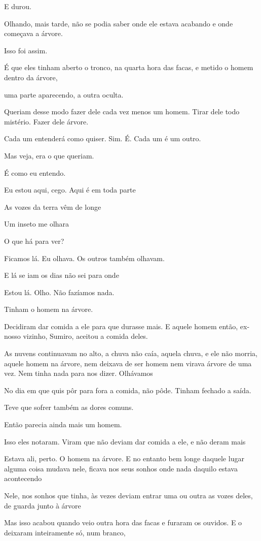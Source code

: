 E durou.

Olhando, mais tarde, não se podia saber onde ele estava acabando e onde
começava a árvore.

Isso foi assim.

É que eles tinham aberto o tronco, na quarta hora das facas, e metido o
homem dentro da árvore,

uma parte aparecendo, a outra oculta.

Queriam desse modo fazer dele cada vez menos um homem. Tirar dele todo
mistério. Fazer dele árvore.

Cada um entenderá como quiser. Sim. É. Cada um é um outro.

Mas veja, era o que queriam.

É como eu entendo.

Eu estou aqui, cego. Aqui é em toda parte

As vozes da terra vêm de longe

Um inseto me olhara

O que há para ver?

Ficamos lá. Eu olhava. Os outros também olhavam.

E lá se iam os dias não sei para onde

Estou lá. Olho. Não fazíamos nada.

Tinham o homem na árvore.

Decidiram dar comida a ele para que durasse mais. E aquele homem então,
ex-nosso vizinho, Sumiro, aceitou a comida deles.

As nuvens continuavam no alto, a chuva não caía, aquela chuva, e ele não
morria, aquele homem na árvore, nem deixava de ser homem nem virava
árvore de uma vez. Nem tinha nada para nos dizer. Olhávamos

No dia em que quis pôr para fora a comida, não pôde. Tinham fechado a
saída.

Teve que sofrer também as dores comuns.

Então parecia ainda mais um homem.

Isso eles notaram. Viram que não deviam dar comida a ele, e não deram
mais

Estava ali, perto. O homem na árvore. E no entanto bem longe daquele
lugar alguma coisa mudava nele, ficava nos seus sonhos onde nada daquilo
estava acontecendo

Nele, nos sonhos que tinha, às vezes deviam entrar uma ou outra as vozes
deles, de guarda junto à árvore

Mas isso acabou quando veio outra hora das facas e furaram os ouvidos. E
o deixaram inteiramente só, num branco,

